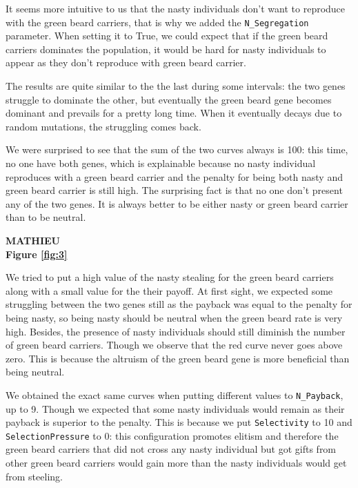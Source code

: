 \documentclass[12pt,a4paper]{article}
\newcommand{\M}{\textbf{MATHIEU}\\}
\begin{document}
It seems more intuitive to us that the nasty individuals don’t want to reproduce with the green beard carriers, that is why we added the \texttt{N\_Segregation} parameter. When setting it to True, we could expect that if the green beard carriers dominates the population, it would be hard for nasty individuals to appear as they don’t reproduce with green beard carrier.

The results are quite similar to the the last during some intervals: the two genes struggle to dominate the other, but eventually the green beard gene becomes dominant and prevails for a pretty long time. When it eventually decays due to random mutations, the struggling comes back.

We were surprised to see that the sum of the two curves always is 100: this time, no one have both genes, which is explainable because no nasty individual reproduces with a green beard carrier and the penalty for being both nasty and green beard carrier is still high. The surprising fact is that no one don’t present any of the two genes. It is always better to be either nasty or green beard carrier than to be neutral.

\vspace{1cm}
\M

\noindent\textbf{Figure \ref{fig:3}}
\vspace{1.5mm}


We tried to put a high value of the nasty stealing for the green beard carriers along with a small value for the their payoff. At first sight, we expected some struggling between the two genes still as the payback was equal to the penalty for being nasty, so being nasty should be neutral when the green beard rate is very high. Besides, the presence of nasty individuals should still diminish the number of green beard carriers. Though we observe that the red curve never goes above zero. This is because the altruism of the green beard gene is more beneficial than being neutral.

We obtained the exact same curves when putting different values to \texttt{N\_Payback}, up to 9. Though we expected that some nasty individuals would remain as their payback is superior to the penalty. This is because we put \texttt{Selectivity} to 10 and \texttt{SelectionPressure} to 0: this configuration promotes elitism and therefore the green beard carriers that did not cross any nasty individual but got gifts from other green beard carriers would gain more than the nasty individuals would get from steeling.
\end{document}
